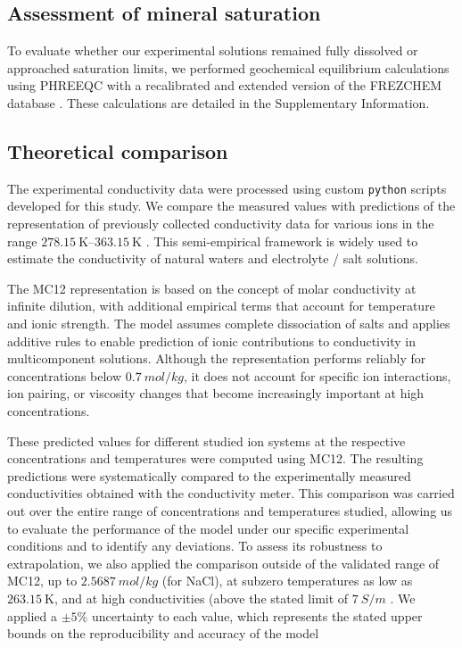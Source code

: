 \documentclass[journal=aesccq,manuscript=article]{achemso}
\begin{document}
\subsection{Assessment of mineral saturation}
To evaluate whether our experimental solutions remained fully dissolved or approached saturation limits, we performed geochemical equilibrium calculations using PHREEQC \citep{parkhurst_description_2013} with a recalibrated and extended version of the FREZCHEM database \citep{naseem_salt_2023, toner_soluble_2013, marion_frezchem:_2010}. 
These calculations are detailed in the Supplementary Information.

\subsection{Theoretical comparison} 

The experimental conductivity data were processed using custom \texttt{python} scripts developed for this study. 
We compare the measured values with predictions of the \citet[][MC12]{McCleskey2012} representation of previously collected conductivity data for various ions in the range $\SIrange{278.15}{363.15}{\kelvin}$ \cite{McCleskey_2011}.
This semi-empirical framework is widely used to estimate the conductivity of natural waters and electrolyte / salt solutions.

The MC12 representation is based on the concept of molar conductivity at infinite dilution, with additional empirical terms that account for temperature and ionic strength. 
The model assumes complete dissociation of salts and applies additive rules to enable prediction of ionic contributions to conductivity in multicomponent solutions. 
Although the representation performs reliably for concentrations below $\SI{0.7}{mol \per kg}$, it does not account for specific ion interactions, ion pairing, or viscosity changes that become increasingly important at high concentrations.

These predicted values for different studied ion systems at the respective concentrations and temperatures were computed using MC12.
The resulting predictions were systematically compared to the experimentally measured conductivities obtained with the conductivity meter. 
This comparison was carried out over the entire range of concentrations and temperatures studied, allowing us to evaluate the performance of the model under our specific experimental conditions and to identify any deviations. 
To assess its robustness to extrapolation, we also applied the comparison outside of the validated range of MC12, up to $\SI{2.5687}{mol \per kg}$ (for NaCl), at subzero temperatures as low as $\SI{263.15}{\kelvin}$, and at high conductivities (above the stated limit of 
$\SI{7}{S \per m}$
. 
We applied a $\pm5\%$ uncertainty to each value, which represents the stated upper bounds on the reproducibility and accuracy of the model \cite{McCleskey_2011,McCleskey2012}
\end{document}
